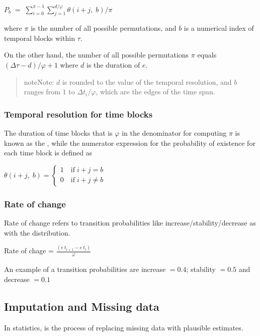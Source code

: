 \documentclass[a4paper,12pt,english]{sphinxhowto}
\begin{document}
\(P_b \;=\; {\sum_{i=0}^{\pi-1} \sum_{j=1}^{d/\varphi} \theta (i+j,\;b)} / {\pi}\)

where \(\pi\) is the number of all possible permutations,
and \(b\) is a numerical index of temporal blocks within \(\tau\).

On the other hand, the number of all possible permutations \(\pi\) equals \({(\Delta \tau - d)}/{\varphi + 1}\)
where \(d\) is the duration of \(e\).
\begin{quote}

\begin{sphinxadmonition}{note}{Note:}
\(d\) is rounded to the value of the temporal resolution, and \(b\) ranges
from \(1\) to \(\Delta t_i/\varphi\), which are the edges of the time span.
\end{sphinxadmonition}
\end{quote}


\subsubsection{Temporal resolution for time blocks}
\label{\detokenize{Uncertainty:temporal-resolution-for-time-blocks}}
The duration of time blocks that is \(\varphi\) in the denominator for computing
\(\pi\) is known as the , while the numerator expression for
the probability of existence for each time block is defined as

\(\theta (i+j,\;b) = \begin{cases}1 \quad \text{if}\; i+j = b  \\ 0 \quad \text{if}\; i+j \neq b \end{cases}\)



\subsubsection{Rate of change}
\label{\detokenize{Uncertainty:rate-of-change}}
Rate of change refers to transition probabilities like increase/stability/decrease as with the {\hyperref[\detokenize{Uncertainty:trap}]{}} distribution.

Rate of chage =  \(\frac{(e~t_{i+1} - e~t_i)}{\varphi}\)

An example of a transition probabilities are increase \(=0.4\); stability \(=0.5\) and decrease \(=0.1\)



\subsection{Imputation and Missing data}
\label{\detokenize{Uncertainty:imputation-and-missing-data}}\label{\detokenize{Uncertainty:missing}}
In statistics,  is the process of replacing missing data with plausible estimates.
\end{document}
